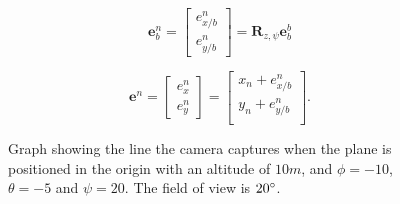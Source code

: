 \begin{equation}
	\bm{e}_b^n =
	\begin{bmatrix}
		e^n_{x/b} \\ e^n_{y/b}
	\end{bmatrix}
	= \bm{R}_{z,\psi} \bm{e}_b^b
\end{equation}

\begin{equation}
	\bm{e}^n =
	\begin{bmatrix}
		e^n_{x} \\ e^n_{y}
	\end{bmatrix}
	=
	\begin{bmatrix}
		x_n + e^n_{x/b} \\
		y_n + e^n_{y/b} \\
	\end{bmatrix}.
\end{equation}

\begin{figure}[]
    \centering
    \caption{Graph showing the line the camera captures when the plane is positioned in the origin with an altitude of $10m$, and $\phi=-10$, $\theta=-5$ and $\psi=20$. The field of view is $20\degree$.}
\end{figure}